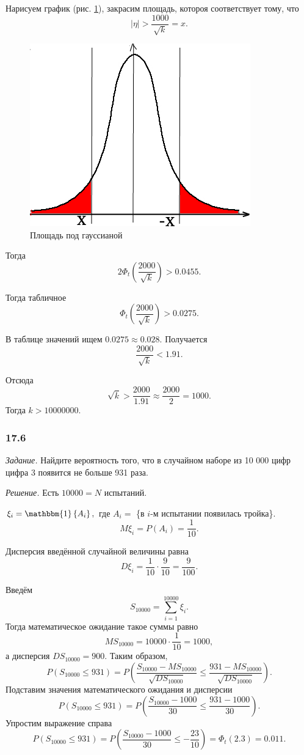 Нарисуем график (рис. \ref{fig:175}), закрасим площадь, котороя соответствует тому, что
$$ \left| \eta \right| >
  \frac{1000}{ \sqrt{k}} =
  x.$$

\begin{figure}[h!]
  \centering
  \includegraphics[width=.4\textwidth]{./pictures/17_5.png}
  \caption{Площадь под гауссианой}
  \label{fig:175}
\end{figure}

Тогда
$$2 \Phi_t \left( \frac{2000}{ \sqrt{k}} \right) >
  0.0455.$$

Тогда табличное
$$ \Phi_t \left( \frac{2000}{ \sqrt{k}} \right) >
  0.0275.$$

В таблице значений ищем $0.0275 \approx 0.028$.
Получается
$$ \frac{2000}{ \sqrt{k}} <
  1.91.$$

Отсюда
$$ \sqrt{k} >
  \frac{2000}{1.91} \approx
  \frac{2000}{2} =
  1000.$$
Тогда $k > 10000000$.

\subsubsection*{17.6}

\textit{Задание.}
Найдите вероятность того, что в случайном наборе из 10 000 цифр цифра 3 появится не больше 931 раза.

\textit{Решение.} Есть $10000 = N$ испытаний.

$ \xi_i = \mathbbm{1} \left\{ A_i \right\},$
где $A_i =$ \{в $i$-м испытании появилась тройка\}.
$$M \xi_i =
  P \left( A_i \right) =
  \frac{1}{10}.$$

Дисперсия введённой случайной величины равна
$$D \xi_i =
  \frac{1}{10} \cdot \frac{9}{10} =
  \frac{9}{100}.$$

Введём
$$S_{10000} =
  \sum \limits_{i = 1}^{10000} \xi_i.$$
Тогда математическое ожидание такое суммы равно
$$MS_{10000} =
  10000 \cdot \frac{1}{10} =
  1000,$$
а дисперсия $DS_{10000} = 900$.
Таким образом,
$$P \left( S_{10000} \leq 931 \right) =
  P \left(
    \frac{S_{10000} - MS_{10000}}{ \sqrt{DS_{10000}}} \leq \frac{931 - MS_{10000}}{ \sqrt{DS_{10000}}}
  \right).$$
Подставим значения математического ожидания и дисперсии
$$P \left( S_{10000} \leq 931 \right) =
  P \left( \frac{S_{10000} - 1000}{30} \leq \frac{931 - 1000}{30} \right).$$
Упростим выражение справа
$$P \left( S_{10000} \leq 931 \right) =
  P \left( \frac{S_{10000} - 1000}{30} \leq -\frac{23}{10} \right) =
  \Phi_t \left( 2.3 \right) =
  0.011.$$

